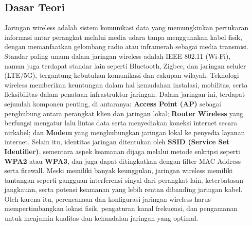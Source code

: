 \subsection{Dasar Teori}
Jaringan wireless adalah sistem komunikasi data yang memungkinkan pertukaran informasi antar perangkat melalui media udara tanpa menggunakan kabel fisik, dengan memanfaatkan gelombang radio atau inframerah sebagai media transmisi. Standar paling umum dalam jaringan wireless adalah IEEE 802.11 (Wi-Fi), namun juga terdapat standar lain seperti Bluetooth, Zigbee, dan jaringan seluler (LTE/5G), tergantung kebutuhan komunikasi dan cakupan wilayah. Teknologi wireless memberikan keuntungan dalam hal kemudahan instalasi, mobilitas, serta fleksibilitas dalam penataan infrastruktur jaringan. Dalam jaringan ini, terdapat sejumlah komponen penting, di antaranya: \textbf{Access Point (AP)} sebagai penghubung antara perangkat klien dan jaringan lokal; \textbf{Router Wireless} yang berfungsi mengatur lalu lintas data serta menyediakan koneksi internet secara nirkabel; dan \textbf{Modem} yang menghubungkan jaringan lokal ke penyedia layanan internet. Selain itu, identitas jaringan ditentukan oleh \textbf{SSID (Service Set Identifier)}, sementara aspek keamanan dijaga melalui metode enkripsi seperti \textbf{WPA2} atau \textbf{WPA3}, dan juga dapat ditingkatkan dengan filter MAC Address serta firewall. Meski memiliki banyak keunggulan, jaringan wireless memiliki tantangan seperti gangguan interferensi sinyal dari perangkat lain, keterbatasan jangkauan, serta potensi keamanan yang lebih rentan dibanding jaringan kabel. Oleh karena itu, perencanaan dan konfigurasi jaringan wireless harus mempertimbangkan lokasi fisik, pengaturan kanal frekuensi, dan pengamanan untuk menjamin kualitas dan kehandalan jaringan yang optimal.

